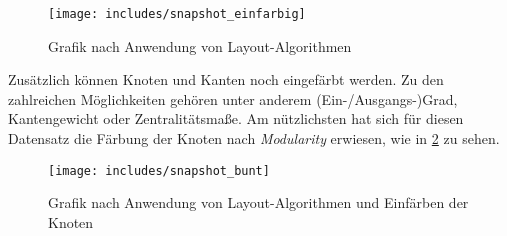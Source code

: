 \documentclass[a4paper,12pt,ngerman]{scrartcl}
\begin{document}
\begin{figure}[ht]
    \centering
    \texttt{[image: includes/snapshot\_einfarbig]}
    \caption{Grafik nach Anwendung von Layout-Algorithmen}
    \label{fig:einfarbig}
\end{figure}

Zusätzlich können Knoten und Kanten noch eingefärbt werden. Zu den zahlreichen Möglichkeiten gehören unter anderem (Ein-/Ausgangs-)Grad, Kantengewicht oder Zentralitätsmaße. Am nützlichsten hat sich für diesen Datensatz die Färbung der Knoten nach \emph{Modularity} erwiesen, wie in \cref{fig:bunt} zu sehen.

\begin{figure}[ht]
    \centering
    \texttt{[image: includes/snapshot\_bunt]}
    \caption{Grafik nach Anwendung von Layout-Algorithmen und Einfärben der Knoten}
    \label{fig:bunt}
\end{figure}
\end{document}
